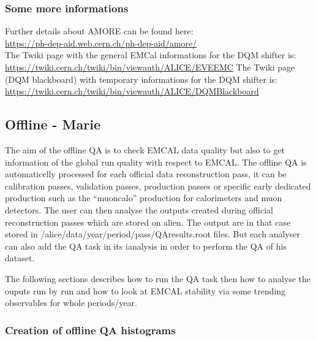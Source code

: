 \subsubsection{Some more informations}
Further details about AMORE can be found here:\\
\href{https://ph-dep-aid.web.cern.ch/ph-dep-aid/amore/}{https://ph-dep-aid.web.cern.ch/ph-dep-aid/amore/}\\
The Twiki page with the general EMCal informations for the DQM shifter is:\\
\href{https://twiki.cern.ch/twiki/bin/viewauth/ALICE/EVEEMC}{https://twiki.cern.ch/twiki/bin/viewauth/ALICE/EVEEMC}
The Twiki page (DQM blackboard) with temporary informations for the DQM shifter is:\\
\href{https://twiki.cern.ch/twiki/bin/viewauth/ALICE/DQMBlackboard}{https://twiki.cern.ch/twiki/bin/viewauth/ALICE/DQMBlackboard}

\subsection{Offline - Marie}
\label{sec:QAOffline}

The aim of the offline QA is to check EMCAL data quality but also to get information of the global run quality with respect to EMCAL. The offline QA is automaticclly processed for each official data reconstruction pass, it can be calibration passes, validation passes, production passes or specific early dedicated production such as the ``muoncalo'' production for calorimeters and muon detectors. The user can then analyse the outputs created during official reconstruction passes which are stored on alien. The output are in that case stored in /alice/data/year/period/pass/QAresults.root files.
But each analyser can also add the QA task in its ianalysis in order to perform the QA of his dataset.


The following sections describes how to run the QA task then how to analyse the ouputs run by run and  how to look at EMCAL stability via some trending observables for whole periods/year.

\subsubsection{Creation of offline QA histograms }

